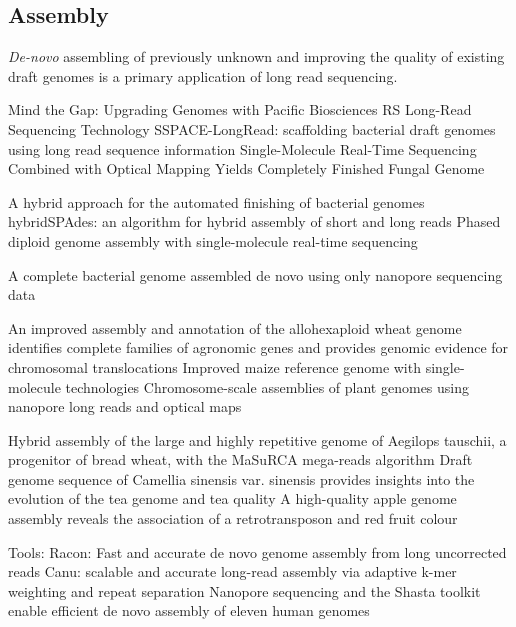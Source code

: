 \subsection{Assembly}
\label{subsec:state_of_art:assembly}

\textit{De-novo} assembling of previously unknown and improving the quality of existing draft genomes is a primary application of long read sequencing.

Mind the Gap: Upgrading Genomes with Pacific Biosciences RS Long-Read Sequencing Technology \cite{English2012}
SSPACE-LongRead: scaffolding bacterial draft genomes using long read sequence information \cite{Boetzer2014}
Single-Molecule Real-Time Sequencing Combined with Optical Mapping Yields Completely Finished Fungal Genome \cite{Faino2015}

A hybrid approach for the automated finishing of bacterial genomes \cite{Bashir2012}
hybridSPAdes: an algorithm for hybrid assembly of short and long reads \cite{Antipov2016}
Phased diploid genome assembly with single-molecule real-time sequencing \cite{Chin2016}

A complete bacterial genome assembled de novo using only nanopore sequencing data \cite{Loman2015}

An improved assembly and annotation of the allohexaploid wheat genome identifies complete families of agronomic genes and provides genomic evidence for chromosomal translocations \cite{Clavijo2017}
Improved maize reference genome with single-molecule technologies \cite{Jiao2017}
Chromosome-scale assemblies of plant genomes using nanopore long reads and optical maps \cite{Belser2018}

Hybrid assembly of the large and highly repetitive genome of Aegilops tauschii, a progenitor of bread wheat, with the MaSuRCA mega-reads algorithm \cite{Zimin2017}
Draft genome sequence of Camellia sinensis var. sinensis provides insights into the evolution of the tea genome and tea quality \cite{Wei2018}
A high-quality apple genome assembly reveals the association of a retrotransposon and red fruit colour \cite{Zhang2019}


Tools:
Racon: Fast and accurate de novo genome assembly from long uncorrected reads \cite{Vaser2017}
Canu: scalable and accurate long-read assembly via adaptive k-mer weighting and repeat separation \cite{Koren2017}
Nanopore sequencing and the Shasta toolkit enable efficient de novo assembly of eleven human genomes \cite{Shafin2020}



